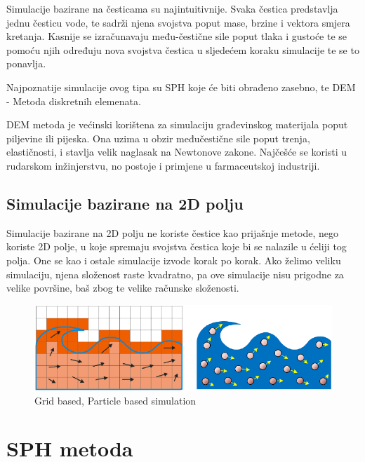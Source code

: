 \documentclass[diplomskirad]{fer}
\begin{document}
    Simulacije bazirane na česticama su najintuitivnije.
    Svaka čestica predstavlja jednu česticu vode, te sadrži njena svojstva poput mase, brzine i vektora smjera kretanja.
    Kasnije se izračunavaju među-čestične sile poput tlaka i gustoće te se pomoću njih određuju nova svojstva čestica u
    sljedećem koraku simulacije te se to ponavlja.

    Najpoznatije simulacije ovog tipa su SPH koje će biti obrađeno zasebno, te DEM - Metoda diskretnih elemenata.

    DEM\cite{DEMmethod} metoda je većinski korištena za simulaciju građevinskog materijala poput piljevine ili pijeska.
    Ona uzima u obzir međučestične sile poput trenja, elastičnosti, i stavlja velik naglasak na Newtonove zakone.
    Najčešće se koristi u rudarskom inžinjerstvu, no postoje i primjene u farmaceutskoj industriji.

    \newpage
    \subsection{Simulacije bazirane na 2D polju}\label{subsec:simulacije-bazirane-na-2d-polju}

    Simulacije bazirane na 2D polju ne koriste čestice kao prijašnje metode, nego koriste 2D polje, u koje spremaju
    svojstva čestica koje bi se nalazile u ćeliji tog polja.
    One se kao i ostale simulacije izvode korak po korak.
    Ako želimo veliku simulaciju, njena složenost raste kvadratno, pa ove simulacije nisu prigodne za velike površine,
    baš zbog te velike računske složenosti.

    \begin{figure}[H]
        \centering
        \includegraphics[scale=0.5]{images/gridBasedParticleBased}
        \caption{
            Grid based, Particle based simulation \cite{gridBasedParticleBased}
        }
        \label{fig:gridBasedParticleBased}
    \end{figure}

    \section{SPH metoda}\label{sec:sph-metoda}
\end{document}
